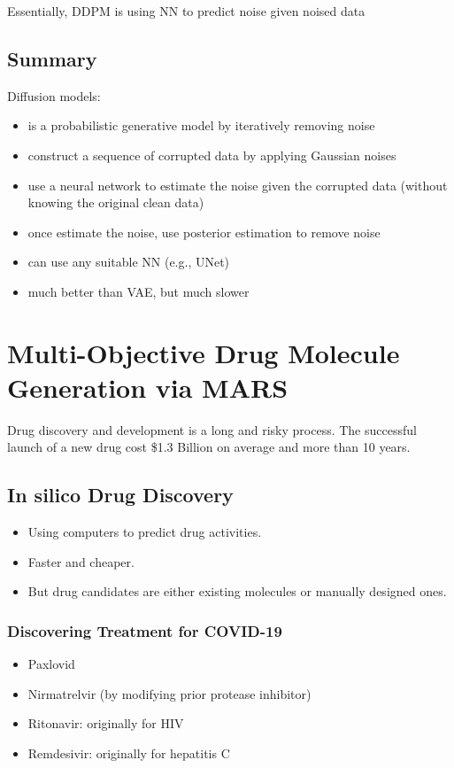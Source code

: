 \documentclass[10pt]{article}
\begin{document}
Essentially, DDPM is using NN to predict noise given noised data

\subsection*{Summary}
Diffusion models:
\begin{itemize}
	\item is a probabilistic generative model by iteratively removing noise
	\item construct a sequence of corrupted data by applying Gaussian noises
	\item use a neural network to estimate the noise given the corrupted data (without knowing the original clean data)
	\item once estimate the noise, use posterior estimation to remove noise
	\item can use any suitable NN (e.g., UNet)
	\item much better than VAE, but much slower
\end{itemize}

\section*{Multi-Objective Drug Molecule Generation via MARS}
Drug discovery and development is a long and risky process.  The successful launch of a new drug cost \$1.3 Billion on average and more than 10 years.

\subsection*{In silico Drug Discovery}
\begin{itemize}
	\item Using computers to predict drug activities.
	\item Faster and cheaper.
	\item But drug candidates are either existing molecules or manually designed ones.
\end{itemize}

\subsubsection*{Discovering Treatment for COVID-19}
\begin{itemize}
	\item Paxlovid
	\item Nirmatrelvir (by modifying prior protease inhibitor)
	\item Ritonavir: originally for HIV
	\item Remdesivir: originally for hepatitis C
\end{itemize}
\end{document}
